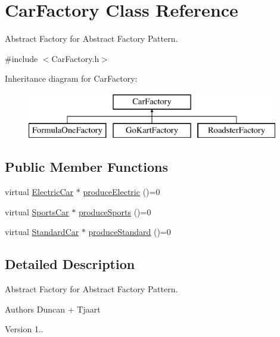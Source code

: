 \hypertarget{class_car_factory}{}\section{Car\+Factory Class Reference}
\label{class_car_factory}


Abstract Factory for Abstract Factory Pattern.  




{\ttfamily \#include $<$Car\+Factory.\+h$>$}

Inheritance diagram for Car\+Factory\+:\begin{figure}[H]
\begin{center}
\leavevmode
\includegraphics[height=2.000000cm]{class_car_factory}
\end{center}
\end{figure}
\subsection*{Public Member Functions}
\begin{DoxyCompactItemize}
\item 
virtual \mbox{\hyperlink{class_electric_car}{Electric\+Car}} $\ast$ \mbox{\hyperlink{class_car_factory_a2a9be1558ef604f44ea3588bcc06b3db}{produce\+Electric}} ()=0
\item 
virtual \mbox{\hyperlink{class_sports_car}{Sports\+Car}} $\ast$ \mbox{\hyperlink{class_car_factory_a6ea0703f2e692c09dea7a3602836410f}{produce\+Sports}} ()=0
\item 
virtual \mbox{\hyperlink{class_standard_car}{Standard\+Car}} $\ast$ \mbox{\hyperlink{class_car_factory_a34ffd5237b689fa31a9a593796d296f2}{produce\+Standard}} ()=0
\end{DoxyCompactItemize}


\subsection{Detailed Description}
Abstract Factory for Abstract Factory Pattern. 

\begin{DoxyAuthor}{Authors}
Duncan + Tjaart 
\end{DoxyAuthor}
\begin{DoxyVersion}{Version}
1.. 
\end{DoxyVersion}


